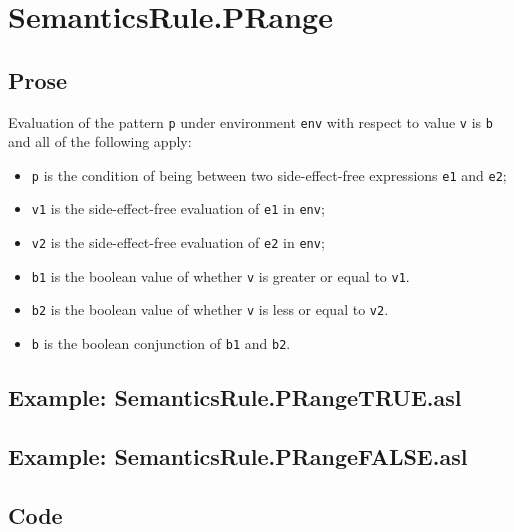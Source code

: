 \documentclass{book}
\begin{document}

\section{SemanticsRule.PRange \label{sec:SemanticsRule.PRange}}

    \subsection{Prose}
  Evaluation of the pattern \texttt{p} under environment \texttt{env} with
  respect to value \texttt{v} is \texttt{b} and all of the following apply:
    \begin{itemize}
      \item \texttt{p} is the condition of being between two side-effect-free expressions \texttt{e1} and \texttt{e2};
      \item \texttt{v1} is the side-effect-free evaluation of \texttt{e1} in \texttt{env};
      \item \texttt{v2} is the side-effect-free evaluation of \texttt{e2} in \texttt{env};
      \item \texttt{b1} is the boolean value of whether \texttt{v} is greater or equal to \texttt{v1}.
      \item \texttt{b2} is the boolean value of whether \texttt{v} is less or equal to \texttt{v2}.
      \item \texttt{b} is the boolean conjunction of \texttt{b1} and \texttt{b2}.
    \end{itemize}

    \subsection{Example: SemanticsRule.PRangeTRUE.asl}

    \subsection{Example: SemanticsRule.PRangeFALSE.asl}

  \subsection{Code}
\end{document}
